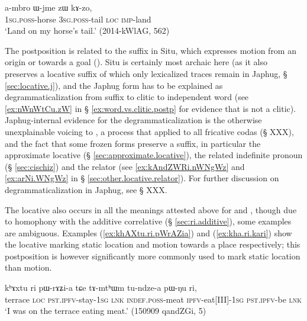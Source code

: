 \begin{exe}
\ex \label{ex:Wjme.zW.kAzo}
\gll   a-mbro ɯ-jme zɯ kɤ-zo, \\
\textsc{1sg}.\textsc{poss}-horse \textsc{3sg}.\textsc{poss}-tail \textsc{loc} \textsc{imp}-land \\ 
\glt `Land on my horse's tail.' (2014-kWlAG, 562)
\end{exe}

The postposition  is related to the suffix  in Situ, which expresses motion from an origin or towards a goal (\citealt[330-331]{linxr93jiarongen}). Situ is certainly most archaic here (as it also preserves a locative  suffix of which only lexicalized traces remain in Japhug, § \ref{sec:locative.j}), and the Japhug form has to be explained as degrammaticalization  from suffix to clitic to independent word (see \ref{ex:nWnWtCu.zW} in § \ref{ex:word.vs.clitic.postp} for evidence that  is not a clitic). Japhug-internal evidence for the degrammaticalization is the otherwise unexplainable voicing to , a process that applied to all fricative codas (§ XXX), and the fact that some frozen forms preserve a  suffix, in particular the approximate locative  (§ \ref{sec:approximate.locative}), the related indefinite pronoun  (§ \ref{sec:cischiz}) and the relator  (see \ref{ex:kAndZWRi.nWNgWz}  and \ref{ex:arNi.WNgWz}  in § \ref{sec:other.locative.relator}). For further discussion on degrammaticalization in Japhug, see § XXX.


 The locative  also occurs in all the meanings attested above for  and , though due to homophony with the additive correlative  (§ \ref{sec:ri.additive}), some examples are ambiguous. Examples (\ref{ex:khAXtu.ri.pWrAZia}) and (\ref{ex:kha.ri.kari}) show the locative  marking static location and motion towards a place respectively;  this postposition is however significantly more commonly used to mark static location than motion.

\begin{exe}
\ex \label{ex:khAXtu.ri.pWrAZia}
\gll   kʰɤxtu ri pɯ-rɤʑi-a tɕe tɤ-mtʰɯm tu-ndze-a pɯ-ŋu ri, \\
terrace \textsc{loc} \textsc{pst}.\textsc{ipfv}-stay-\textsc{1sg} \textsc{lnk} \textsc{indef}.\textsc{poss}-meat \textsc{ipfv}-eat[III]-\textsc{1sg} \textsc{pst}.\textsc{ipfv}-be \textsc{lnk} \\
\glt `I was on the terrace eating meat.' (150909 qandZGi, 5)
 \end{exe}
 
